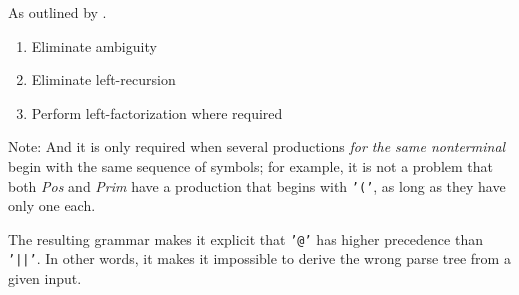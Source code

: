 \documentclass[
paper=a4,
oneside,
fontsize=11pt,
numbers=noenddot,
headinclude=false, %
footinclude=false, %
fleqn,             %
DIV=8
]{scrartcl}
\begin{document}
As outlined by \citet[p.~69]{mogensen2011}.

\begin{enumerate}
\item Eliminate ambiguity
\item Eliminate left-recursion
\item Perform left-factorization where required
\end{enumerate}

Note: And it is only required when several productions {\em for the same
  nonterminal} begin with the same sequence of symbols; for example, it is not a
problem that both {\em Pos} and {\em Prim} have a production that begins with
{\tt '('}, as long as they have only one each.

The resulting grammar makes it explicit that {\tt '@'} has higher precedence
than {\tt '||'}. In other words, it makes it impossible to derive the wrong
parse tree from a given input.
\end{document}

